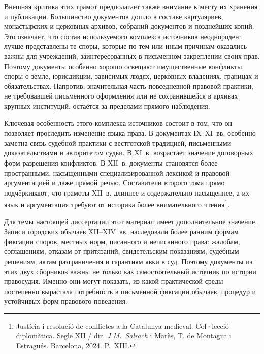 Внешняя критика этих грамот предполагает также внимание к месту их хранения и публикации. Большинство документов дошло в составе картуляриев, монастырских и церковных архивов, собраний документов и позднейших копий. Это означает, что состав используемого комплекса источников неоднороден: лучше представлены те споры, которые по тем или иным причинам оказались важны для учреждений, заинтересованных в письменном закреплении своих прав. Поэтому документы особенно хорошо освещают имущественные конфликты, споры о земле, юрисдикции, зависимых людях, церковных владениях, границах и обязательствах. Напротив, значительная часть повседневной правовой практики, не требовавшей письменного оформления или не сохранившейся в архивах крупных институций, остаётся за пределами прямого наблюдения.

Ключевая особенность этого комплекса источников состоит в том, что он позволяет проследить изменение языка права. В документах IX--XI~вв. особенно заметна связь судебной практики с вестготской традицией, письменными доказательствами и авторитетом судьи. В XI~в. возрастает значение договорных форм разрешения конфликтов. В XII~в. документы становятся более пространными, насыщенными специализированной лексикой и правовой аргументацией и даже прямой речью. Составители второго тома прямо подчёркивают, что грамоты XII~в. длиннее и содержательно насыщеннее, а их язык и аргументация требуют от историка более внимательного чтения\footnote{Justícia i resolució de conflictes a la Catalunya medieval. Col·lecció diplomàtica. Segle XII / dir. \emph{J.M.~Salrach} i Marès, T. de Montagut i Estragués. Barcelona, 2024. P.~XIII.}.

Для темы настоящей диссертации этот материал имеет дополнительное значение. Записи городских обычаев XII--XIV~вв. наследовали более ранним формам фиксации споров, местных норм, писанного и неписанного права: жалобам, соглашениям, отказам от притязаний, свидетельским показаниям, судебным решениям, актам разграничения и гарантиям явки в суд. Поэтому документы из этих двух сборников важны не только как самостоятельный источник по истории правосудия. Именно они могут показать, из какой практической среды постепенно вырастала потребность в письменной фиксации обычаев, процедур и устойчивых форм правового поведения.

